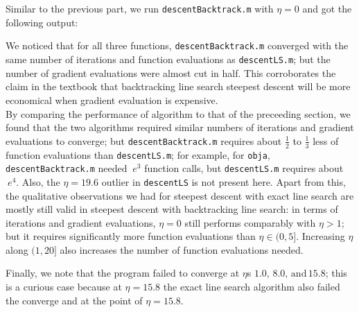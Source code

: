 \documentclass[11pt]{article}
\begin{document}
\section{}
Similar to the previous part, we run \texttt{descentBacktrack.m} with $\eta=0$ and got the following output:
\begin{figure}[h]
\end{figure}
We noticed that for all three functions, \texttt{descentBacktrack.m} converged with the same number of iterations and function evaluations as \texttt{descentLS.m}; but the number of gradient evaluations were almost cut in half. This corroborates the claim in the textbook that backtracking line search steepest descent will be more economical when gradient evaluation is expensive.\\[0.4cm]
By comparing the performance of algorithm to that of the preceeding section, we found that the two algorithms required similar numbers of iterations and gradient evaluations to converge; but \texttt{descentBacktrack.m} requires about $\frac12$ to $\frac13$ less of function evaluations than \texttt{descentLS.m}; for example, for \texttt{obja}, \texttt{descentBacktrack.m} needed $~e^3$ function calls, but \texttt{descentLS.m} requires about $~e^4$. Also, the $\eta=19.6$ outlier in \texttt{descentLS} is not present here.
Apart from this, the qualitative observations we had for steepest descent with exact line search are mostly still valid in steepest descent with backtracking line search: in terms of iterations and gradient evaluations, $\eta=0$ still performs comparably with $\eta > 1$; but it requires significantly more function evaluations than $\eta \in (0,5].$ Increasing $\eta$ along $(1,20]$ also increases the number of function evaluations needed.
\begin{figure}[ht]
\end{figure}
\begin{figure}[ht]
\end{figure}
\begin{figure}[ht]
\end{figure}
Finally, we note that the program failed to converge at $\eta$s $1.0,\, 8.0,\,\text{and}\,15.8$; this is a curious case because at $\eta=15.8$ the exact line search algorithm also failed the converge and at the point of $\eta=15.8$.
\end{document}
